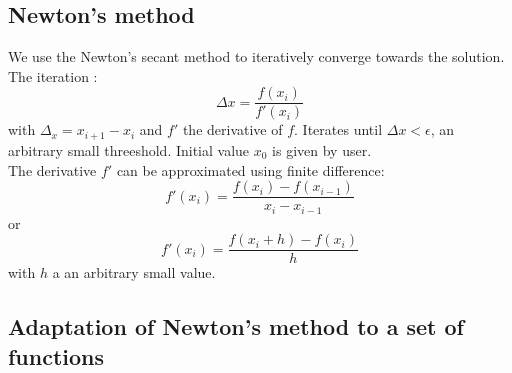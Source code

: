 \documentclass[a4paper]{scrartcl}
\begin{document}
\subsection{Newton's method}

We use the Newton's secant method to iteratively converge towards the solution.
\\
The iteration :
\begin{equation}
	\Delta x = \frac{f(x_i)}{f'(x_i)}
	\label{eq:newton-iteration}
\end{equation}
with $\Delta_x = x_{i+1} - x_i$ and $f'$ the derivative of $f$.
Iterates until $\Delta x < \epsilon$, an arbitrary small threeshold. 
Initial value $x_0$ is given by user.
\\
The derivative $f'$ can be approximated using finite difference:
\begin{equation}
	f'(x_i) = \frac{f(x_i) - f(x_{i-1})}{x_i - x_{i-1}} 
	\label{eq:fp1}
\end{equation}
or
\begin{equation}
	f'(x_i) = \frac{f(x_i + h) - f(x_i)}{h} 
	\label{eq:fp2}
\end{equation}
with $h$ a an arbitrary small value.

\subsection{Adaptation of Newton's method to a set of functions}
\end{document}
